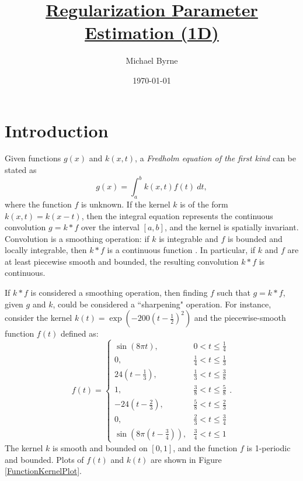 \documentclass[12pt]{article}
\title{\underline{Regularization Parameter Estimation (1D)}}
\author{Michael Byrne}
\date{\today}
\newcommand{\gcon}{g}
\newcommand{\kcon}{k}
\newcommand{\fcon}{f}
\begin{document}
\maketitle

\section{Introduction} \label{Introduction}
Given functions $\gcon(x)$ and $\kcon(x,t)$, a \textit{Fredholm equation of the first kind} can be stated as
\begin{equation}
	\gcon(x) = \int_a^b \kcon(x,t)\fcon(t)\:dt,
	\label{Eq_Con}
\end{equation}
where the function $\fcon$ is unknown. If the kernel $\kcon$ is of the form $\kcon(x,t) = \kcon(x-t)$, then the integral equation represents the continuous convolution $\gcon = \kcon * \fcon$ over the interval $[a,b]$, and the kernel is spatially invariant. Convolution is a smoothing operation: if $\kcon$ is integrable and $\fcon$ is bounded and locally integrable, then $\kcon * \fcon$ is a continuous function \cite{DebnathLokenath1999ItHs}. In particular, if $\kcon$ and $\fcon$ are at least piecewise smooth and bounded, the resulting convolution $\kcon * \fcon$ is continuous. \par
If $\kcon * \fcon$ is considered a smoothing operation, then finding $\fcon$ such that $\gcon = \kcon * \fcon$, given $\gcon$ and $\kcon$, could be considered a ``sharpening" operation. For instance, consider the kernel $\kcon(t) = \exp(-200(t-\frac{1}{2})^2)$ and the piecewise-smooth function $\fcon(t)$ defined as:
\begin{equation}
\fcon(t) = \begin{cases}
\sin\left(8\pi{t}\right), & 0 < t \leq \frac{1}{4} \\
0, & \frac{1}{4} < t \leq \frac{1}{3} \\
24\left(t-\frac{1}{3}\right), & \frac{1}{3} < t \leq \frac{3}{8} \\
1, & \frac{3}{8} < t \leq \frac{5}{8} \\
-24\left(t-\frac{2}{3}\right), & \frac{5}{8} < t \leq \frac{2}{3} \\
0, & \frac{2}{3} < t \leq \frac{3}{4} \\
\sin\left(8\pi\left(t-\frac{3}{4}\right)\right), & \frac{3}{4} < t \leq 1
\end{cases}.
\label{Eq_TF2}
\end{equation}
The kernel $\kcon$ is smooth and bounded on $[0,1]$, and the function $\fcon$ is 1-periodic and bounded. Plots of $\fcon(t)$ and $\kcon(t)$ are shown in Figure \ref{FunctionKernelPlot}. \par
\end{document}
